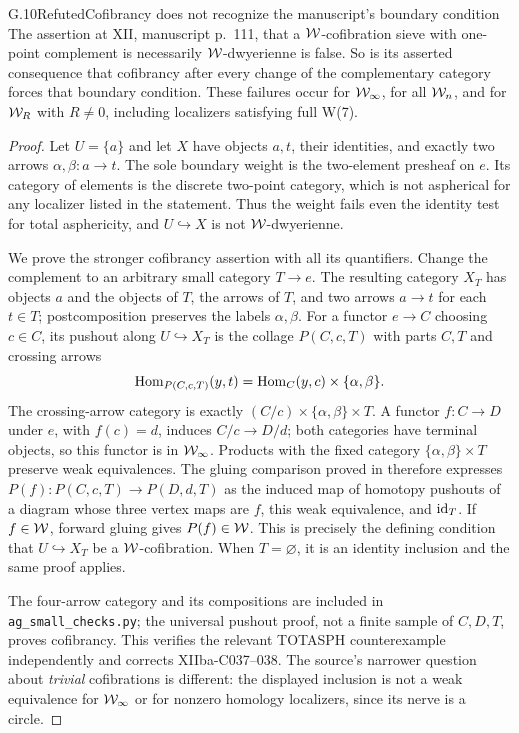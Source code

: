 \begin{claim}{G.10}{Refuted}{Cofibrancy does not recognize the manuscript's boundary condition}
The assertion at XII, manuscript p.~111, that a $\mathcal{W}$-cofibration sieve with one-point complement is necessarily $\mathcal{W}$-dwyerienne is false. So is its asserted consequence that cofibrancy after every change of the complementary category forces that boundary condition. These failures occur for $\mathcal{W}_{\infty}$, for all $\mathcal{W}_n$, and for $\mathcal{W}_R$ with $R\ne0$, including localizers satisfying full W(7).
\end{claim}
\begin{proof}
Let $U=\{a\}$ and let $X$ have objects $a,t$, their identities, and exactly two arrows $\alpha,\beta:a\to t$. The sole boundary weight is the two-element presheaf on $e$. Its category of elements is the discrete two-point category, which is not aspherical for any localizer listed in the statement. Thus the weight fails even the identity test for total asphericity, and $U\hookrightarrow X$ is not $\mathcal{W}$-dwyerienne.

We prove the stronger cofibrancy assertion with all its quantifiers. Change the complement to an arbitrary small category $T\to e$. The resulting category $X_T$ has objects $a$ and the objects of $T$, the arrows of $T$, and two arrows $a\to t$ for each $t\in T$; postcomposition preserves the labels $\alpha,\beta$. For a functor $e\to C$ choosing $c\in C$, its pushout along $U\hookrightarrow X_T$ is the collage $P(C,c,T)$ with parts $C,T$ and crossing arrows
\[
\operatorname{Hom}_{P(C,c,T)}(y,t)=\operatorname{Hom}_C(y,c)\times\{\alpha,\beta\}.
\]
The crossing-arrow category is exactly $(C/c)\times\{\alpha,\beta\}\times T$. A functor $f:C\to D$ under $e$, with $f(c)=d$, induces $C/c\to D/d$; both categories have terminal objects, so this functor is in $\mathcal{W}_{\infty}$. Products with the fixed category $\{\alpha,\beta\}\times T$ preserve weak equivalences. The gluing comparison proved in  therefore expresses $P(f):P(C,c,T)\to P(D,d,T)$ as the induced map of homotopy pushouts of a diagram whose three vertex maps are $f$, this weak equivalence, and $\mathrm{id}_T$. If $f\in\mathcal{W}$, forward gluing gives $P(f)\in\mathcal{W}$. This is precisely the defining condition that $U\hookrightarrow X_T$ be a $\mathcal{W}$-cofibration. When $T=\varnothing$, it is an identity inclusion and the same proof applies.

The four-arrow category and its compositions are included in \texttt{ag\_small\_checks.py}; the universal pushout proof, not a finite sample of $C,D,T$, proves cofibrancy. This verifies the relevant TOTASPH counterexample independently and corrects XIIba-C037--038. The source's narrower question about \emph{trivial} cofibrations is different: the displayed inclusion is not a weak equivalence for $\mathcal{W}_{\infty}$ or for nonzero homology localizers, since its nerve is a circle.
\end{proof}

